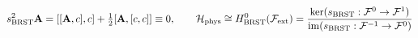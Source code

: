 \documentclass[preview]{standalone}
\begin{document}
\begin{align*}
\special{dvisvgm:raw <g id='unique000'>}s_{\text{BRST}}^2 \mathbf{A} = [[\mathbf{A},c],c]+\tfrac{1}{2}[\mathbf{A},[c,c]] \equiv 0, \qquad \mathcal{H}_{\text{phys}} \cong H^0_{\text{BRST}}(\mathcal{F}_{\text{ext}}) = \frac{\ker(s_{\text{BRST}}: \mathcal{F}^0\to\mathcal{F}^1)}{\operatorname{im}(s_{\text{BRST}}: \mathcal{F}^{-1}\to\mathcal{F}^0)}\special{dvisvgm:raw </g>}
\end{align*}
\end{document}
